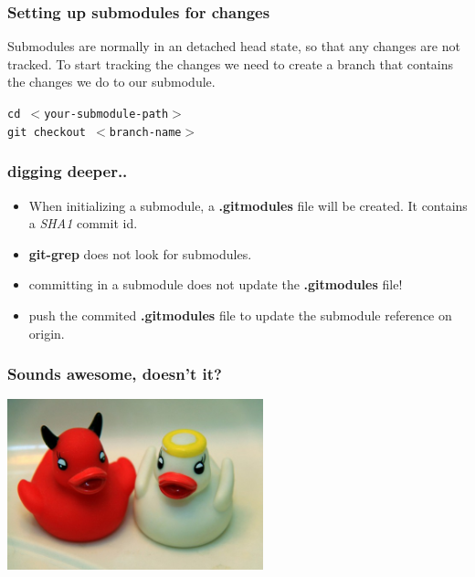 \begin{frame}[fragile]
  \frametitle{Setting up submodules for changes}
   Submodules are normally in an detached head state, so that any changes are not tracked. To start tracking the changes we need to create a branch that contains the changes we do to our submodule.
   
    \begin{center}\texttt{cd $<$your-submodule-path$>$}\\ \texttt{git checkout $<$branch-name$>$ }\end{center} 

\end{frame}

\begin{frame}
	\frametitle{digging deeper..}
	\begin{itemize}
		\item When initializing a submodule, a \textbf{.gitmodules} file will be created. It contains a \emph{SHA1} commit id.
		\item \textbf{git-grep} does not look for submodules.
		\item committing in a submodule does not update the \textbf{.gitmodules} file!
		\item push the commited \textbf{.gitmodules} file to update the submodule reference on origin.
	\end{itemize}
\end{frame}

\begin{frame}
	\frametitle{Sounds awesome, doesn't it?}
\begin{center}\includegraphics[width=280px]{images/goodbad.jpg}\end{center}
\end{frame}